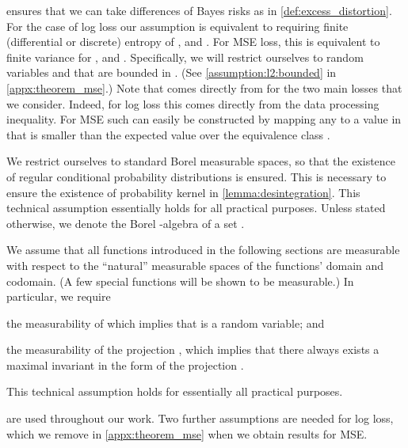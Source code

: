 \documentclass[final]{article}
\begin{document}
 ensures that we can take differences of Bayes risks as in \cref{def:excess_distortion}.
For the case of log loss our assumption is equivalent to requiring finite (differential or discrete) entropy of ,  and .
For MSE loss, this is equivalent to finite variance for ,  and . Specifically, we will restrict ourselves to random variables  and  that are bounded in . (See \cref{assumption:l2:bounded} in \cref{appx:theorem_mse}.)
Note that  comes directly from  for the two main losses that we consider.
Indeed, for log loss this comes directly from the data processing inequality.
For MSE such  can easily be constructed by mapping any  to a value in  that is smaller than the expected value over the equivalence class .

\begin{assumption} 
\label{assumption:regular} 
We restrict ourselves to standard Borel measurable spaces, so that the existence of regular conditional probability distributions is ensured. 
This is necessary to ensure the existence of probability kernel in \cref{lemma:desintegration}. 
This technical assumption essentially holds for all practical purposes. Unless stated otherwise, we denote  the Borel -algebra of a set .
\end{assumption}

\begin{assumption} \label{assumption:measurability} 
We assume that all functions introduced in the following sections are measurable with respect to the ``natural'' measurable spaces of the functions' domain and codomain. (A few special functions will be shown to be measurable.) 
In particular, we require 
\begin{inlinelist}
\item the measurability of  which implies that  is a random variable; and
\item the measurability of the projection , which implies that there always exists a maximal invariant in the form of the projection . 
\end{inlinelist}
This technical assumption holds for essentially all practical purposes.
\end{assumption}



 are used throughout our work.
Two further assumptions are needed for log loss, which we remove in \cref{appx:theorem_mse} when we obtain results for MSE.
\end{document}
